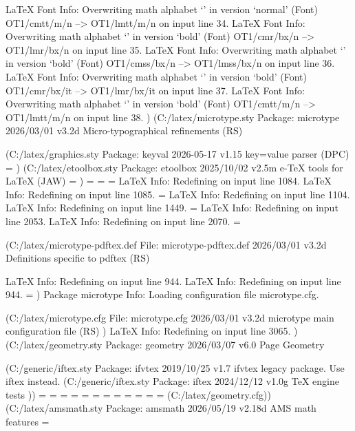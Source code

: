 LaTeX Font Info:    Overwriting math alphabet `\mathtt' in version `normal'
(Font)                  OT1/cmtt/m/n --> OT1/lmtt/m/n on input line 34.
LaTeX Font Info:    Overwriting math alphabet `\mathbf' in version `bold'
(Font)                  OT1/cmr/bx/n --> OT1/lmr/bx/n on input line 35.
LaTeX Font Info:    Overwriting math alphabet `\mathsf' in version `bold'
(Font)                  OT1/cmss/bx/n --> OT1/lmss/bx/n on input line 36.
LaTeX Font Info:    Overwriting math alphabet `\mathit' in version `bold'
(Font)                  OT1/cmr/bx/it --> OT1/lmr/bx/it on input line 37.
LaTeX Font Info:    Overwriting math alphabet `\mathtt' in version `bold'
(Font)                  OT1/cmtt/m/n --> OT1/lmtt/m/n on input line 38.
) (C:\MikTeX\tex/latex/microtype\microtype.sty
Package: microtype 2026/03/01 v3.2d Micro-typographical refinements (RS)

(C:\MikTeX\tex/latex/graphics\keyval.sty
Package: keyval 2026-05-17 v1.15 key=value parser (DPC)
\KV@toks@=
)
(C:\MikTeX\tex/latex/etoolbox\etoolbox.sty
Package: etoolbox 2025/10/02 v2.5m e-TeX tools for LaTeX (JAW)
\etb@tempcnta=
)
\MT@toks=
\MT@tempbox=
\MT@count=
LaTeX Info: Redefining \noprotrusionifhmode on input line 1084.
LaTeX Info: Redefining \leftprotrusion on input line 1085.
\MT@prot@toks=
LaTeX Info: Redefining \rightprotrusion on input line 1104.
LaTeX Info: Redefining \textls on input line 1449.
\MT@outer@kern=
LaTeX Info: Redefining \microtypecontext on input line 2053.
LaTeX Info: Redefining \textmicrotypecontext on input line 2070.
\MT@listname@count=

(C:\MikTeX\tex/latex/microtype\microtype-pdftex.def
File: microtype-pdftex.def 2026/03/01 v3.2d Definitions specific to pdftex (RS)

LaTeX Info: Redefining \lsstyle on input line 944.
LaTeX Info: Redefining \lslig on input line 944.
\MT@outer@space=
)
Package microtype Info: Loading configuration file microtype.cfg.

(C:\MikTeX\tex/latex/microtype\microtype.cfg
File: microtype.cfg 2026/03/01 v3.2d microtype main configuration file (RS)
)
LaTeX Info: Redefining \microtypesetup on input line 3065.
)
(C:\MikTeX\tex/latex/geometry\geometry.sty
Package: geometry 2026/03/07 v6.0 Page Geometry

(C:\MikTeX\tex/generic/iftex\ifvtex.sty
Package: ifvtex 2019/10/25 v1.7 ifvtex legacy package. Use iftex instead.
 (C:\MikTeX\tex/generic/iftex\iftex.sty
Package: iftex 2024/12/12 v1.0g TeX engine tests
))
\Gm@cnth=
\Gm@cntv=
\c@Gm@tempcnt=
\Gm@bindingoffset=
\Gm@wd@mp=
\Gm@odd@mp=
\Gm@even@mp=
\Gm@layoutwidth=
\Gm@layoutheight=
\Gm@layouthoffset=
\Gm@layoutvoffset=
\Gm@dimlist=
 (C:\MikTeX\tex/latex/geometry\geometry.cfg))
(C:\MikTeX\tex/latex/amsmath\amsmath.sty
Package: amsmath 2026/05/19 v2.18d AMS math features
\@mathmargin=

